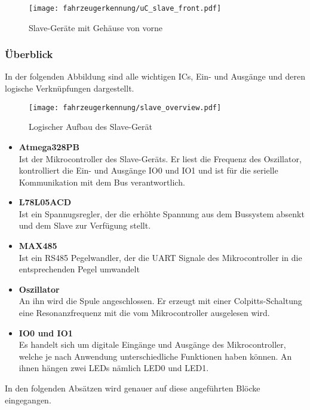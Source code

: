 \begin{figure}[H]
    \centering
    \texttt{[image: fahrzeugerkennung/uC\_slave\_front.pdf]}
    \caption{Slave-Geräte mit Gehäuse von vorne}
    \label{fig:slave_front}
\end{figure}

\subsubsection{Überblick}

In der folgenden Abbildung sind alle wichtigen ICs, Ein- und Ausgänge und deren logische Verknüpfungen dargestellt. 

\begin{figure}[H]
    \centering
    \texttt{[image: fahrzeugerkennung/slave\_overview.pdf]}
    \caption{Logischer Aufbau des Slave-Gerät}
\end{figure}

\begin{itemize}
    \item \textbf{Atmega328PB} \\
    Ist der Mikrocontroller des Slave-Geräts. Er liest die Frequenz des Oszillator, kontrolliert die Ein- und Ausgänge IO0 und IO1 und ist für die serielle Kommunikation mit dem Bus verantwortlich.
    \item \textbf{L78L05ACD} \\
    Ist ein Spannugsregler, der die erhöhte Spannung aus dem Bussystem absenkt und dem Slave zur Verfügung stellt.
    \item \textbf{MAX485} \\
    Ist ein RS485 Pegelwandler, der die UART Signale des Mikrocontroller in die entsprechenden Pegel umwandelt
    \item \textbf{Oszillator} \\
    An ihn wird die Spule angeschlossen. Er erzeugt mit einer Colpitts-Schaltung eine Resonanzfrequenz mit die vom Mikrocontroller ausgelesen wird.
    
    \item \textbf{IO0 und IO1} \\
    Es handelt sich um digitale Eingänge und Ausgänge des Mikrocontroller, welche je nach Anwendung unterschiedliche Funktionen haben können. An ihnen hängen zwei LEDs nämlich LED0 und LED1.
\end{itemize}

In den folgenden Absätzen wird genauer auf diese angeführten Blöcke eingegangen.

